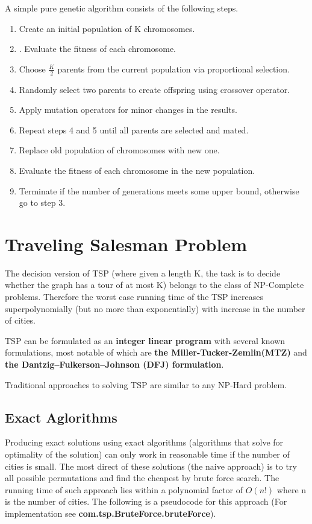 \documentclass[11pt]{article}
\begin{document}
A simple pure genetic algorithm consists of the following steps.
\indent
\begin{enumerate}
\item Create an initial population of K chromosomes.
\item. Evaluate the fitness of each chromosome.
\item Choose $\frac{K}{2} $ parents from the current population via proportional selection.
\item Randomly select two parents to create offspring using crossover operator.
\item Apply mutation operators for minor changes in the results.
\item Repeat steps 4 and 5 until all parents are selected and mated.
\item Replace old population of chromosomes with new one.
\item Evaluate the fitness of each chromosome in the new population.
\item Terminate if the number of generations meets some upper bound, otherwise go to step 3.
\end{enumerate}

\section{Traveling Salesman Problem}
The decision version of TSP (where given a length K, the task is to decide whether the graph has a tour of at most K) belongs to the class of NP-Complete problems. Therefore the worst case running time of the TSP increases superpolynomially (but no more than exponentially) with increase in the number of cities.  \par

TSP can be formulated as an \textbf{integer linear program}\cite{ilp1, ilp2, ilp3} with several known formulations, most notable of which are \textbf{the Miller-Tucker-Zemlin(MTZ)} and \textbf{the Dantzig–Fulkerson–Johnson (DFJ) formulation}. \par
Traditional approaches to solving TSP are similar to any NP-Hard problem.
\subsection{Exact Aglorithms} Producing exact solutions using exact algorithms (algorithms that solve for optimality of the solution) can only work in reasonable time if the number of cities is small. The most direct of these solutions (the naive approach) is to try all possible permutations and find the cheapest by brute force search. The running time of such approach lies within a polynomial factor of $O(n!)$ where n is the number of cities. The following is a pseudocode for this approach (For implementation see \textbf{com.tsp.BruteForce.bruteForce}).
 
\end{document}
